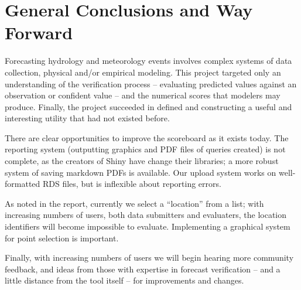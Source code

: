 \documentclass[logos,parttoc,morelanguage=french,morelanguage=german]{orsay-memoire}
\begin{document}

\strut\newpage


\part{General Conclusions and Way Forward}

Forecasting hydrology and meteorology events involves complex systems of data collection, physical and/or empirical modeling. This project targeted only an understanding of the verification process -- evaluating predicted values against an observation or confident value -- and the numerical scores that modelers may produce. Finally, the project succeeded in defined and constructing a useful and interesting utility that had not existed before.

There are clear opportunities to improve the scoreboard as it exists today. The reporting system (outputting graphics and PDF files of queries created) is not complete, as the creators of Shiny have change their libraries; a more robust system of saving markdown PDFs is available. Our upload system works on well-formatted RDS files, but is inflexible about reporting errors.

As noted in the report, currently we select a ``location'' from a list; with increasing numbers of users, both data submitters and evaluaters, the location identifiers will become impossible to evaluate. Implementing a graphical system for point selection is important. 

Finally, with increasing numbers of users we will begin hearing more community feedback, and ideas from those with expertise in forecast verification -- and a little distance from the tool itself -- for improvements and changes.

\clearpage


\end{document}
